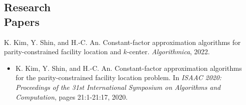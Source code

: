 \documentclass[margin, 10pt]{res} %
\begin{document}
\begin{resume}

\section{Research \\ Papers}
K. Kim, Y. Shin, and H.-C. An. Constant-factor approximation algorithms for parity-constrained facility location and $k$-center. \emph{Algorithmica}, 2022.
\begin{itemize} \itemsep -2pt %
\item[] K. Kim, Y. Shin, and H.-C. An. Constant-factor approximation algorithms for the parity-constrained facility location problem. In \emph{ISAAC 2020: Proceedings of the 31st International Symposium on Algorithms and Computation}, pages 21:1-21:17, 2020.
\end{itemize}


\end{resume}
\end{document}
